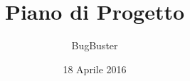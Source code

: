 




\title{\textbf{Piano di Progetto}}
\author{BugBuster}

\date{18 Aprile 2016}




\makeFrontPage

\tableofcontents





